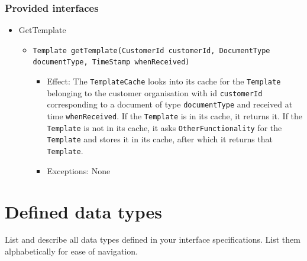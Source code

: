 \documentclass[a4paper,10pt]{article}
\begin{document}
\subsubsection*{Provided interfaces}
\begin{itemize}
	\item GetTemplate
    \begin{itemize}
   		\item \texttt{Template getTemplate(CustomerId customerId, DocumentType documentType, TimeStamp whenReceived)}
        \begin{itemize}
            \item Effect:  The \texttt{TemplateCache} looks into its cache for the \texttt{Template} belonging to the customer organisation with id \texttt{customerId} corresponding to a document of type \texttt{documentType} and received at time \texttt{whenReceived}. If the \texttt{Template} is in its cache, it returns it. If the \texttt{Template} is not in its cache, it asks \texttt{OtherFunctionality} for the \texttt{Template} and stores it in its cache, after which it returns that \texttt{Template}.
            \item Exceptions: None
        \end{itemize}
    \end{itemize}
\end{itemize}
















\section{Defined data types}\label{app:datatypes}
List and describe all data types defined in your interface specifications. List
them alphabetically for ease of navigation.
\end{document}
